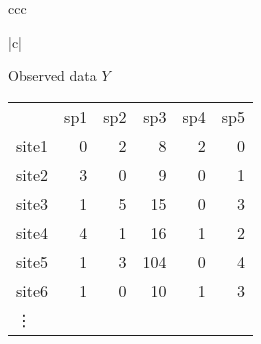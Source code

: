 \documentclass[8pt]{beamer}
\begin{document}
{\begin{tabular}{ccc}
    \begin{tabular}{|c|}

      \hline

      Observed data $Y$ \\ 

      \hline

      \scriptsize{\tt \begin{tabular}{lrrrrr}

        & sp1 & sp2 & sp3 & sp4 & sp5 \\ 

        site1 & 0 & 2 & 8 & 2 & 0 \\ 

        site2 & 3 & 0 & 9 & 0 & 1 \\ 

        site3 & 1 & 5 & 15 & 0 & 3 \\ 

        site4 & 4 & 1 & 16 & 1 & 2 \\ 

        site5 & 1 & 3 & 104 & 0 & 4 \\ 

        site6 & 1 & 0 & 10 & 1 & 3 \\

        \vdots

      \end{tabular} } \\

      \hline

    \end{tabular} 

  \end{tabular}

  }

  

\backupend

\end{document}
